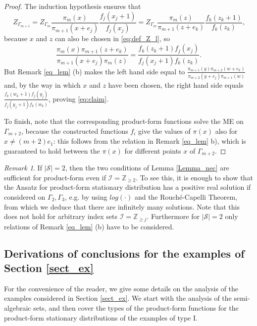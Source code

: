 \documentclass{amsart}
\theoremstyle{definition}
\theoremstyle{remark}
\newtheorem{remark}[theorem]{Remark}
\theoremstyle{Conjecture/open problem}
\theoremstyle{assumption}
\theoremstyle{conjecture}
\def\Ga{\Gamma}
\def\cS{\mathcal{S}}
\def\Z{\mathbb{Z}}
\numberwithin{equation}{section}
\begin{document}
\begin{proof}
The induction hypothesis ensures that $$Z_{\Gamma _{m+1}}=Z_{\Gamma _m}\frac{\pi _m(x)}{\pi _{m+1}(x+e_j)}\frac{f_j(x_j+1)}{f_j(x_j)}=Z_{\Gamma _{m}}\frac{\pi _m(z)}{\pi _{m+1}(z+e_k)}\frac{f_k(z_k+1)}{f_k(z_k)}\mbox{,}$$
because $x$ and $z$ can also be chosen in \eqref{eq:def_Z_l}, so
$$\frac{\pi _m(x)\pi _{m+1}(z+e_k)}{\pi _{m+1}(x+e_j)\pi _{m}(z)}=\frac{f_k(z_k+1)f_j(x_j)}{f_j(x_j+1)f_k(z_k)}\mbox{.}$$
But Remark \ref{eq_lem} (b) makes the left hand side equal to $\frac{\pi _{m+1}(y)\pi _{m+2}(w+e_k)}{\pi _{m+2}(y+e_j)\pi _{m+1}(w)}$ and, by the way in which $x$ and $z$ have been chosen, the right hand side equals $\frac{f_k(w_k+1)f_j(y_j)}{f_j(y_j+1)f_k(w_k)}$, proving \eqref{eq:claim}.

To finish, note that the corresponding product-form functions solve the ME on $\Ga_{m+2}$, because the constructed functions $f_i$  give the values of $\pi (x) $ also for $x\neq (m+2)e_1$: this follows from the relation in Remark \ref{eq_lem} b), which is guaranteed to hold between the $\pi (x)$ for different points $x$ of $\Gamma _{m+2}$.  

\end{proof}

\begin{remark}\label{rem_2} If $|\cS|=2$, then the two conditions of Lemma \ref{Lemma_nec} are sufficient for product-form even if $\mathcal{I}=\Z_{\geq 2}$. To see this, it is enough to show that the Ansatz for product-form stationary distribution has a positive real solution if considered on $\Ga_2,\Ga_3$, e.g. by using $log(\cdot)$ and the Rouch\'e-Capelli Theorem, from which we deduce that there are infinitely many solutions. Note that this does not hold for arbitrary index sets $\mathcal{I}=\Z_{\geq j}$. Furthermore for $|\cS|=2$ only relations of Remark \ref{eq_lem} (b) have to be considered. 
\end{remark}

\subsection{Derivations of conclusions for the examples of Section \ref{sect_ex}}\label{subs_examples}
For the convenience of the reader, we give some details on the analysis of the examples considered in Section \ref{sect_ex}. We start with the analysis of the semi-algebraic sets, and then cover the types of the product-form functions for the product-form stationary distributions of the examples of type I.
\end{document}
